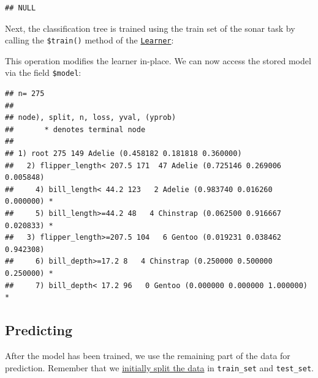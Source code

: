 \documentclass[
]{scrbook}
\newenvironment{Shaded}{\begin{snugshade}}{\end{snugshade}}
\newcommand{\AttributeTok}[1]{\textcolor[rgb]{0.77,0.63,0.00}{#1}}
\newcommand{\FunctionTok}[1]{\textcolor[rgb]{0.00,0.00,0.00}{#1}}
\newcommand{\NormalTok}[1]{#1}
\newcommand{\OtherTok}[1]{\textcolor[rgb]{0.56,0.35,0.01}{#1}}
\newcommand{\SpecialCharTok}[1]{\textcolor[rgb]{0.00,0.00,0.00}{#1}}
\renewenvironment{Shaded} {\begin{snugshade}\small} {\end{snugshade}}
\begin{document}
\begin{verbatim}
## NULL
\end{verbatim}

Next, the classification tree is trained using the train set of the sonar task by calling the \texttt{\$train()} method of the \href{https://mlr3.mlr-org.com/reference/Learner.html}{\texttt{Learner}}:

\begin{Shaded}
\end{Shaded}

This operation modifies the learner in-place.
We can now access the stored model via the field \texttt{\$model}:

\begin{Shaded}
\end{Shaded}

\begin{verbatim}
## n= 275 
## 
## node), split, n, loss, yval, (yprob)
##       * denotes terminal node
## 
## 1) root 275 149 Adelie (0.458182 0.181818 0.360000)  
##   2) flipper_length< 207.5 171  47 Adelie (0.725146 0.269006 0.005848)  
##     4) bill_length< 44.2 123   2 Adelie (0.983740 0.016260 0.000000) *
##     5) bill_length>=44.2 48   4 Chinstrap (0.062500 0.916667 0.020833) *
##   3) flipper_length>=207.5 104   6 Gentoo (0.019231 0.038462 0.942308)  
##     6) bill_depth>=17.2 8   4 Chinstrap (0.250000 0.500000 0.250000) *
##     7) bill_depth< 17.2 96   0 Gentoo (0.000000 0.000000 1.000000) *
\end{verbatim}

\hypertarget{predicting}{%
\subsection{Predicting}\label{predicting}}

After the model has been trained, we use the remaining part of the data for prediction.
Remember that we \protect\hyperlink{split-data}{initially split the data} in \texttt{train\_set} and \texttt{test\_set}.

\begin{Shaded}
\end{Shaded}
\end{document}
